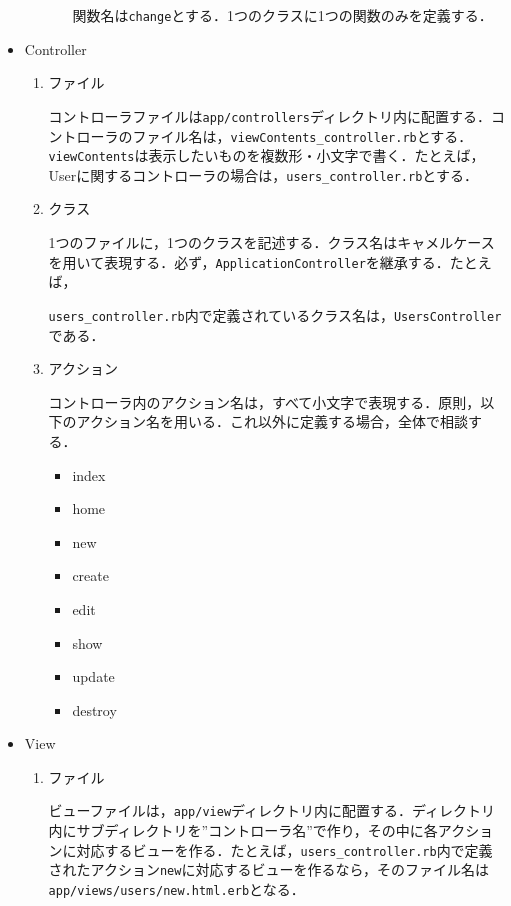 \begin{itemize}
\begin{enumerate}
\begin{enumerate}
            関数名は\texttt{change}とする．1つのクラスに1つの関数のみを定義する．
        \end{enumerate}
    \end{enumerate}
    
    \item Controller
    \begin{enumerate}
        \item ファイル

        コントローラファイルは\texttt{app/controllers}ディレクトリ内に配置する．コントローラのファイル名は，\texttt{viewContents\_controller.rb}とする．\texttt{viewContents}は表示したいものを複数形・小文字で書く．たとえば，Userに関するコントローラの場合は，\texttt{users\_controller.rb}とする．
        \item クラス

        1つのファイルに，1つのクラスを記述する．クラス名はキャメルケースを用いて表現する．必ず，\texttt{ApplicationController}を継承する．たとえば，
        
        \texttt{users\_controller.rb}内で定義されているクラス名は，\texttt{UsersController}である．
        \item アクション

        コントローラ内のアクション名は，すべて小文字で表現する．原則，以下のアクション名を用いる．これ以外に定義する場合，全体で相談する．
        \begin{itemize}
            \item index
            \item home
            \item new
            \item create
            \item edit
            \item show
            \item update
            \item destroy
        \end{itemize}
    \end{enumerate}
    \item View
    \begin{enumerate}
        \item ファイル

        ビューファイルは，\texttt{app/view}ディレクトリ内に配置する．ディレクトリ内にサブディレクトリを”コントローラ名”で作り，その中に各アクションに対応するビューを作る．たとえば，\texttt{users\_controller.rb}内で定義されたアクション\texttt{new}に対応するビューを作るなら，そのファイル名は\texttt{app/views/users/new.html.erb}となる．
    \end{enumerate}
\end{itemize}

